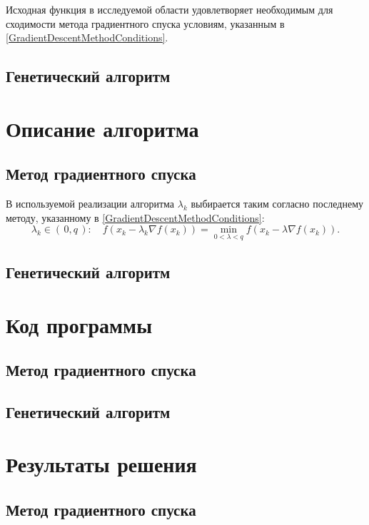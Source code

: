 \documentclass[10pt,a4paper,titlepage]{article}
\begin{document}
Исходная функция в исследуемой области %
удовлетворяет необходимым для сходимости метода градиентного спуска условиям, указанным в \ref{GradientDescentMethodConditions}.

\subsection{Генетический алгоритм}


\section{Описание алгоритма}
\subsection{Метод градиентного спуска}

В используемой реализации алгоритма $\lambda_k$ выбирается таким согласно последнему методу, указанному в \ref{GradientDescentMethodConditions}:
$$
  \lambda_k \in (\,0, q\,)\!: 
    \quad f(x_k - \lambda_k \nabla f(x_k)) = \min\limits_{0 < \lambda < q} f(x_k - \lambda \nabla f(x_k)). 
$$

\subsection{Генетический алгоритм}

\section{Код программы}
\subsection{Метод градиентного спуска}

\subsection{Генетический алгоритм}

\section{Результаты решения}
\subsection{Метод градиентного спуска}
\end{document}
